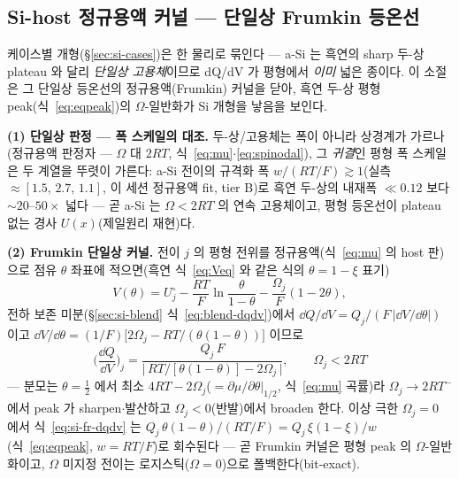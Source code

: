\subsection{Si-host 정규용액 커널 --- 단일상 Frumkin 등온선}\label{ssec:si-frumkin}
케이스별 개형(\S\ref{sec:si-cases})은 한 물리로 묶인다 --- a-Si 는 흑연의 sharp 두-상 plateau 와 달리 \emph{단일상
고용체}이므로 dQ/dV 가 평형에서 \emph{이미} 넓은 종이다. 이 소절은 그 단일상 등온선의 정규용액(Frumkin) 커널을
닫아, 흑연 두-상 평형 peak(식~\eqref{eq:eqpeak})의 $\Omega$-일반화가 Si 개형을 낳음을 보인다.

\textbf{(1) 단일상 판정 --- 폭 스케일의 대조.} 두-상/고용체는 폭이 아니라 상경계가 가르나(정규용액 판정자 ---
$\Omega$ 대 $2RT$, 식~\eqref{eq:mu}$\cdot$\eqref{eq:spinodal}), 그 \emph{귀결}인 평형 폭 스케일은 두 계열을 뚜렷이
가른다: a-Si 전이의 규격화 폭 $w/(RT/F)\gtrsim1$(실측 $\approx[1.5,\,2.7,\,1.1]$, 이 세션 정규용액 fit, tier B)로
흑연 두-상의 내재폭 $\ll0.12$ 보다 $\sim20$--$50\times$ 넓다 --- 곧 a-Si 는 $\Omega<2RT$ 의 연속 고용체이고, 평형
등온선이 plateau 없는 경사 $U(x)$(제일원리 재현\cite{chevrier_dahn2009,artrith2018})다.

\textbf{(2) Frumkin 단일상 커널.} 전이 $j$ 의 평형 전위를 정규용액(식~\eqref{eq:mu} 의 host 판)으로 점유 $\theta$
좌표에 적으면(흑연 식~\eqref{eq:Veq} 와 같은 식의 $\theta{=}1{-}\xi$ 표기)
\begin{equation}
V(\theta)=U_j^\circ-\frac{RT}{F}\ln\frac{\theta}{1-\theta}-\frac{\Omega_j}{F}(1-2\theta),
\label{eq:si-fr-V}
\end{equation}
전하 보존 미분(\S\ref{sec:si-blend} 식~\eqref{eq:blend-dqdv})에서 $\dd Q/\dd V=Q_j/(F\,|\dd V/\dd\theta|)$ 이고
$\dd V/\dd\theta=(1/F)\big[2\Omega_j-RT/(\theta(1-\theta))\big]$ 이므로
\begin{equation}
\boxed{\;\Big(\frac{\dd Q}{\dd V}\Big)_j=\frac{Q_j\,F}{\big|\,RT/[\theta(1-\theta)]-2\Omega_j\,\big|},
\qquad \Omega_j<2RT\;}
\label{eq:si-fr-dqdv}
\end{equation}
--- 분모는 $\theta{=}\tfrac12$ 에서 최소 $4RT-2\Omega_j$($=\partial\mu/\partial\theta|_{1/2}$, 식~\eqref{eq:mu} 곡률)라
$\Omega_j\!\to\!2RT^-$ 에서 peak 가 sharpen$\cdot$발산하고 $\Omega_j<0$(반발)에서 broaden 한다. 이상 극한 $\Omega_j{=}0$
에서 식~\eqref{eq:si-fr-dqdv} 는 $Q_j\,\theta(1-\theta)/(RT/F)=Q_j\,\xi(1-\xi)/w$(식~\eqref{eq:eqpeak}, $w{=}RT/F$)로
회수된다 --- 곧 Frumkin 커널은 평형 peak 의 $\Omega$-일반화이고, $\Omega$ 미지정 전이는 로지스틱($\Omega{=}0$)으로
폴백한다(bit-exact).

